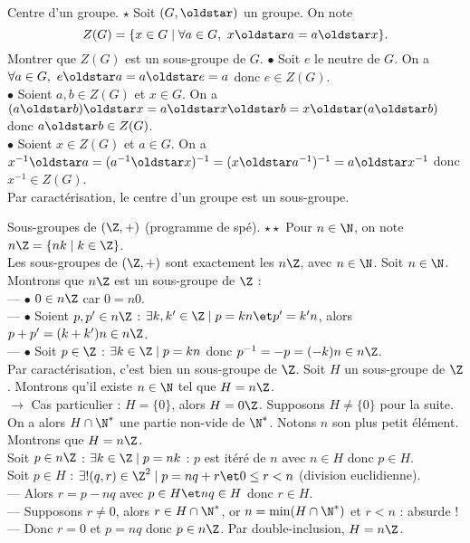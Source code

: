 \documentclass[11pt]{article}
\begin{document}
\begin{ex}{Centre d'un groupe. $\star$}{}
    Soit $(G,\s)$ un groupe. On note
    \begin{equation*}
        Z(G)=\{x\in G \mid \forall a \in G, ~ x \s a = a \s x\}.
    \end{equation*}
    Montrer que $Z(G)$ est un sous-groupe de $G$.
    \tcblower
    $\bullet$ Soit $e$ le neutre de $G$. On a $\forall a \in G, ~ e \s a = a \s e = a$ donc $e\in Z(G)$.\\
    $\bullet$ Soient $a,b\in Z(G)$ et $x\in G$. On a $(a\s b)\s x = a \s x \s b = x \s (a \s b)$ donc $a\s b \in Z(G)$.\\
    $\bullet$ Soient $x\in Z(G)$ et $a\in G$. On a $x^{-1}\s a = (a^{-1} \s x)^{-1} = ( x \s a^{-1})^{-1} = a \s x^{-1}$ donc $x^{-1}\in Z(G)$.\\
    Par caractérisation, le centre d'un groupe est un sous-groupe.
\end{ex}

\begin{prop}{Sous-groupes de $(\Z,+)$ (programme de spé). $\star\star$}{}
    Pour $n\in\N$, on note $n\Z=\{nk\mid k \in \Z\}$.\\
    Les sous-groupes de $(\Z,+)$ sont exactement les $n\Z$, avec $n\in\N$.
    \tcblower
    Soit $n\in\N$. Montrons que $n\Z$ est un sous-groupe de $\Z$ :\\
    --- $\bullet$ $0\in n\Z$ car $0 = n0$.\\
    --- $\bullet$ Soient $p,p'\in n\Z$ : $\exists k,k' \in \Z \mid p=kn \et p'=k'n$, alors $p+p'=(k+k')n \in n\Z$.\\
    --- $\bullet$ Soit $p\in\Z$ : $\exists k \in \Z \mid p = kn$ donc $p^{-1}=-p=(-k)n\in n\Z$.\\
    Par caractérisation, c'est bien un sous-groupe de $\Z$.\n
    Soit $H$ un sous-groupe de $\Z$. Montrons qu'il existe $n\in\N$ tel que $H=n\Z$.\\
    $\to$ Cas particulier : $H=\{0\}$, alors $H=0\Z$. Supposons $H\neq\{0\}$ pour la suite.\\
    On a alors $H\cap\N^*$ une partie non-vide de $\N^*$. Notons $n$ son plus petit élément. Montrons que $H=n\Z$.\\
    \boxed{\supset} Soit $p\in n\Z$ : $\exists k \in \Z \mid p = nk$ : $p$ est itéré de $n$ avec $n\in H$ donc $p\in H$.\\
    \boxed{\subset} Soit $p\in H$ : $\exists!(q,r)\in\Z^2 \mid p = nq+r \et 0 \leq r < n$ (division euclidienne).\\
    --- Alors $r=p-nq$ avec $p\in H \et nq\in H$ donc $r\in H$.\\
    --- Supposons $r\neq0$, alors $r\in H\cap \N^*$, or $n=\min(H\cap\N^*)$ et $r<n$ : absurde !\\
    --- Donc $r=0$ et $p=nq$ donc $p\in n\Z$.\n
    Par double-inclusion, $H=n\Z$.
\end{prop}
\end{document}
